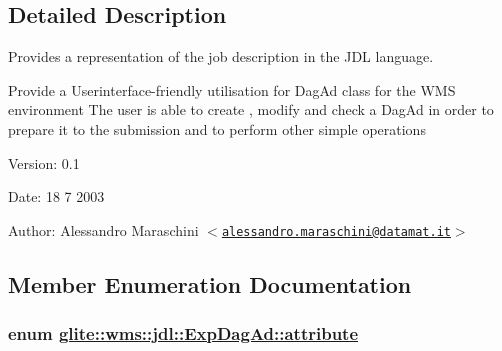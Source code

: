 \subsection{Detailed Description}
Provides a representation of the job description in the JDL language. 

Provide a Userinterface-friendly utilisation for Dag\-Ad class for the WMS environment The user is able to create , modify and check a Dag\-Ad in order to prepare it to the submission and to perform other simple operations

\begin{Desc}
\item[Version:]0.1 \end{Desc}
\begin{Desc}
\item[Date:]18 7 2003 \end{Desc}
\begin{Desc}
\item[Author:]Alessandro Maraschini $<$\href{mailto:alessandro.maraschini@datamat.it}{\tt alessandro.maraschini@datamat.it}$>$ \end{Desc}




\subsection{Member Enumeration Documentation}
\hypertarget{classglite_1_1wms_1_1jdl_1_1ExpDagAd_w10}{
\subsubsection[attribute]{\setlength{\rightskip}{0pt plus 5cm}enum \hyperlink{classglite_1_1wms_1_1jdl_1_1ExpDagAd_w10}{glite::wms::jdl::Exp\-Dag\-Ad::attribute}}}
\label{classglite_1_1wms_1_1jdl_1_1ExpDagAd_w10}


